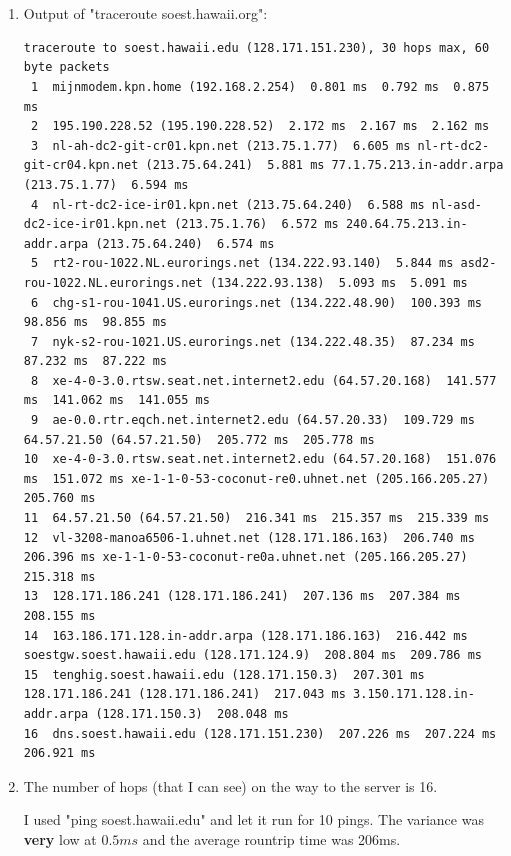 \documentclass[12pt, a4paper]{article}
\begin{document}
\section{} %
\begin{enumerate}[a]
	\item %
	Output of "traceroute soest.hawaii.org":

	\begin{lstlisting}
traceroute to soest.hawaii.edu (128.171.151.230), 30 hops max, 60 byte packets
 1  mijnmodem.kpn.home (192.168.2.254)  0.801 ms  0.792 ms  0.875 ms
 2  195.190.228.52 (195.190.228.52)  2.172 ms  2.167 ms  2.162 ms
 3  nl-ah-dc2-git-cr01.kpn.net (213.75.1.77)  6.605 ms nl-rt-dc2-git-cr04.kpn.net (213.75.64.241)  5.881 ms 77.1.75.213.in-addr.arpa (213.75.1.77)  6.594 ms
 4  nl-rt-dc2-ice-ir01.kpn.net (213.75.64.240)  6.588 ms nl-asd-dc2-ice-ir01.kpn.net (213.75.1.76)  6.572 ms 240.64.75.213.in-addr.arpa (213.75.64.240)  6.574 ms
 5  rt2-rou-1022.NL.eurorings.net (134.222.93.140)  5.844 ms asd2-rou-1022.NL.eurorings.net (134.222.93.138)  5.093 ms  5.091 ms
 6  chg-s1-rou-1041.US.eurorings.net (134.222.48.90)  100.393 ms  98.856 ms  98.855 ms
 7  nyk-s2-rou-1021.US.eurorings.net (134.222.48.35)  87.234 ms  87.232 ms  87.222 ms
 8  xe-4-0-3.0.rtsw.seat.net.internet2.edu (64.57.20.168)  141.577 ms  141.062 ms  141.055 ms
 9  ae-0.0.rtr.eqch.net.internet2.edu (64.57.20.33)  109.729 ms 64.57.21.50 (64.57.21.50)  205.772 ms  205.778 ms
10  xe-4-0-3.0.rtsw.seat.net.internet2.edu (64.57.20.168)  151.076 ms  151.072 ms xe-1-1-0-53-coconut-re0.uhnet.net (205.166.205.27)  205.760 ms
11  64.57.21.50 (64.57.21.50)  216.341 ms  215.357 ms  215.339 ms
12  vl-3208-manoa6506-1.uhnet.net (128.171.186.163)  206.740 ms  206.396 ms xe-1-1-0-53-coconut-re0a.uhnet.net (205.166.205.27)  215.318 ms
13  128.171.186.241 (128.171.186.241)  207.136 ms  207.384 ms  208.155 ms
14  163.186.171.128.in-addr.arpa (128.171.186.163)  216.442 ms soestgw.soest.hawaii.edu (128.171.124.9)  208.804 ms  209.786 ms
15  tenghig.soest.hawaii.edu (128.171.150.3)  207.301 ms 128.171.186.241 (128.171.186.241)  217.043 ms 3.150.171.128.in-addr.arpa (128.171.150.3)  208.048 ms
16  dns.soest.hawaii.edu (128.171.151.230)  207.226 ms  207.224 ms  206.921 ms
	\end{lstlisting}

	\item %
	The number of hops (that I can see) on the way to the server is 16.

	I used "ping soest.hawaii.edu" and let it run for 10 pings. The variance was \textbf{very} low at $0.5ms$ and the average rountrip time was 206ms.


\end{enumerate}
\end{document}
